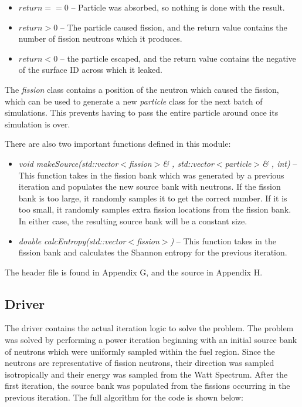 \begin{itemize}
\item $return == 0$ -- Particle was absorbed, so nothing is done with the result.
\item $return > 0$ -- The particle caused fission, and the return value contains the number of fission neutrons which it produces.
\item $return < 0$ -- the particle escaped, and the return value contains the negative of the surface ID across which it leaked.
\end{itemize}

The \textit{fission} class contains a position of the neutron which caused the fission, which can be used to generate a new \textit{particle} class for the next batch of simulations.  This prevents having to pass the entire particle around once its simulation is over.

There are also two important functions defined in this module:

\begin{itemize}
\item \textit{void makeSource(std::vector$<$fission$>$\& , std::vector$<$particle$>$\& , int)} -- This function takes in the fission bank which was generated by a previous iteration and populates the new source bank with neutrons.  If the fission bank is too large, it randomly samples it to get the correct number.  If it is too small, it randomly samples extra fission locations from the fission bank.  In either case, the resulting source bank will be a constant size.
\item \textit{double calcEntropy(std::vector$<$fission$>$)} -- This function takes in the fission bank and calculates the Shannon entropy for the previous iteration.
\end{itemize}

The header file is found in Appendix G, and the source in Appendix H.

\subsection{Driver}\label{ss:driver}

The driver contains the actual iteration logic to solve the problem.  The problem was solved by performing a power iteration beginning with an initial source bank of neutrons which were uniformly sampled within the fuel region.  Since the neutrons are representative of fission neutrons, their direction was sampled isotropically and their energy was sampled from the Watt Spectrum.  After the first iteration, the source bank was populated from the fissions occurring in the previous iteration.  The full algorithm for the code is shown below:

